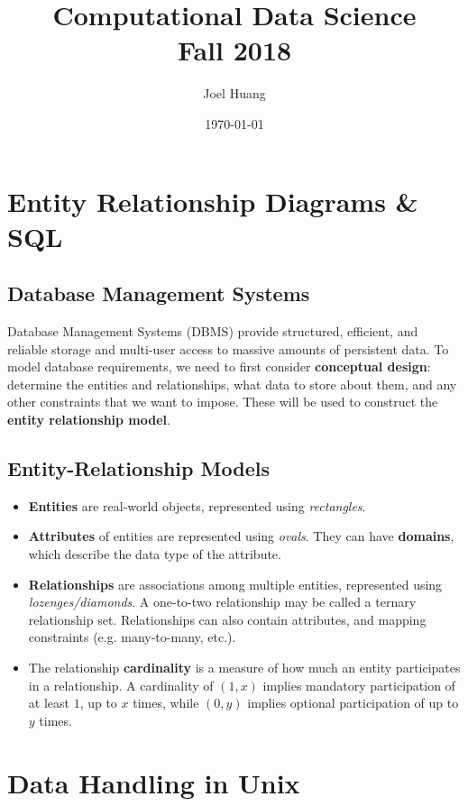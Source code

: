 \documentclass[9pt,twocolumn]{article}
\title{
	Computational Data Science\\
	Fall 2018
}
\author{Joel Huang}
\date{\today}
\begin{document}
\maketitle

\section{Entity Relationship Diagrams \& SQL}

\subsection*{Database Management Systems}
Database Management Systems (DBMS) provide structured, efficient, and reliable storage and multi-user access to massive amounts of persistent data. To model database requirements, we need to first consider \textbf{conceptual design}: determine the entities and relationships, what data to store about them, and any other constraints that we want to impose. These will be used to construct the \textbf{entity relationship model}.

\subsection*{Entity-Relationship Models}
\begin{itemize}
	\item \textbf{Entities} are real-world objects, represented using \textit{rectangles}.
	\item \textbf{Attributes} of entities are represented using \textit{ovals}. They can have \textbf{domains}, which describe the data type of the attribute.
	\item \textbf{Relationships} are associations among multiple entities, represented using \textit{lozenges/diamonds}. A one-to-two relationship may be called a ternary relationship set. Relationships can also contain attributes, and mapping constraints (e.g. many-to-many, etc.).
	\item The relationship \textbf{cardinality} is a measure of how much an entity participates in a relationship. A cardinality of $(1,x)$ implies mandatory participation of at least $1$, up to $x$ times, while $(0,y)$ implies optional participation of up to $y$ times.
\end{itemize}


\section{Data Handling in Unix}
\end{document}
